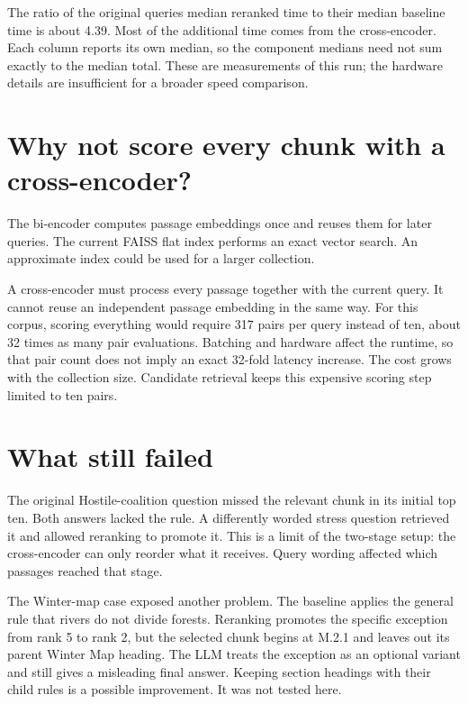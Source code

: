 \documentclass[11pt,a4paper]{article}
\begin{document}
The ratio of the original queries\textquotesingle{} median reranked time
to their median baseline time is about 4.39. Most of the additional time
comes from the cross-encoder. Each column reports its own median, so the
component medians need not sum exactly to the median total. These are
measurements of this run; the hardware details are insufficient for a
broader speed comparison.

\section{Why not score every chunk with a cross-encoder?}

The bi-encoder computes passage embeddings once and reuses them for later
queries. The current FAISS flat index performs an exact vector search.
An approximate index could be used for a larger collection.

A cross-encoder must process every passage together with the current query.
It cannot reuse an independent passage embedding in the same way.
For this corpus, scoring everything would require 317 pairs per query
instead of ten, about 32 times as many pair evaluations. Batching and
hardware affect the runtime, so that pair count does not imply an exact
32-fold latency increase. The cost grows with the collection size.
Candidate retrieval keeps this expensive scoring step limited to ten pairs.

\section{What still failed}

The original Hostile-coalition question missed the relevant chunk in its
initial top ten. Both answers lacked the rule. A differently worded stress
question retrieved it and allowed reranking to promote it. This is a
limit of the two-stage setup: the cross-encoder can only reorder what it
receives. Query wording affected which passages reached that stage.

The Winter-map case exposed another problem. The baseline applies the
general rule that rivers do not divide forests. Reranking promotes the
specific exception from rank 5 to rank 2, but the selected chunk begins
at M.2.1 and leaves out its parent Winter Map heading. The LLM treats
the exception as an optional variant and still gives a misleading final
answer. Keeping section headings with their child rules is a possible
improvement. It was not tested here.
\end{document}
